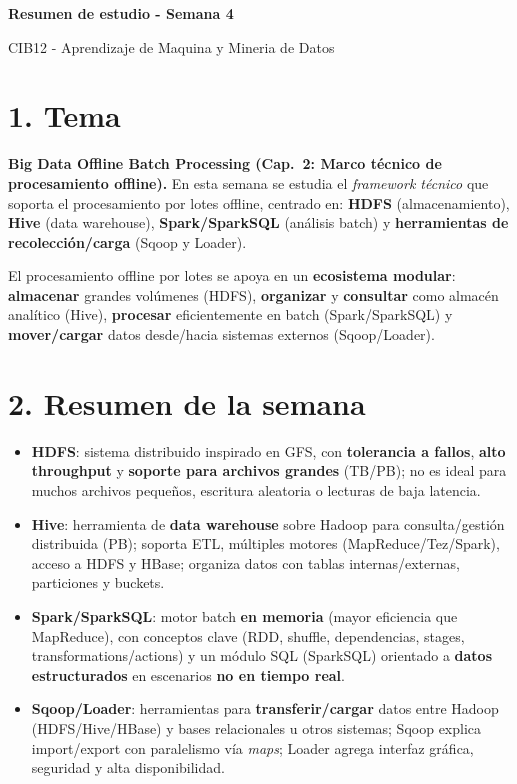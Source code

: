 \documentclass[8pt,a4paper,twocolumn]{article}
\newcommand{\resumentitulo}{Resumen de estudio - Semana 4}
\begin{document}
\vspace*{-1.0em}
\begin{tcolorbox}[colback=black!12,colframe=black!35,boxrule=0.3pt,arc=1pt,left=4pt,right=4pt,top=3pt,bottom=3pt]
{\bfseries\normalsize \resumentitulo\par}
{\scriptsize CIB12 - Aprendizaje de Maquina y Mineria de Datos\par}
\end{tcolorbox}
\vspace{0.15em}

\section{1. Tema}
\textbf{Big Data Offline Batch Processing (Cap.\ 2: Marco técnico de procesamiento offline).} En esta semana se estudia el \textit{framework técnico} que soporta el procesamiento por lotes offline, centrado en: \textbf{HDFS} (almacenamiento), \textbf{Hive} (data warehouse), \textbf{Spark/SparkSQL} (análisis batch) y \textbf{herramientas de recolección/carga} (Sqoop y Loader).

\begin{tcolorbox}[colback=black!7,colframe=black!35,boxrule=0.3pt,arc=1pt,left=4pt,right=4pt,top=3pt,bottom=3pt,title=\textbf{Idea central}]
El procesamiento offline por lotes se apoya en un \textbf{ecosistema modular}: \textbf{almacenar} grandes volúmenes (HDFS), \textbf{organizar} y \textbf{consultar} como almacén analítico (Hive), \textbf{procesar} eficientemente en batch (Spark/SparkSQL) y \textbf{mover/cargar} datos desde/hacia sistemas externos (Sqoop/Loader).
\end{tcolorbox}

\section{2. Resumen de la semana}
\begin{itemize}
\item \textbf{HDFS}: sistema distribuido inspirado en GFS, con \textbf{tolerancia a fallos}, \textbf{alto throughput} y \textbf{soporte para archivos grandes} (TB/PB); no es ideal para muchos archivos pequeños, escritura aleatoria o lecturas de baja latencia.
\item \textbf{Hive}: herramienta de \textbf{data warehouse} sobre Hadoop para consulta/gestión distribuida (PB); soporta ETL, múltiples motores (MapReduce/Tez/Spark), acceso a HDFS y HBase; organiza datos con tablas internas/externas, particiones y buckets.
\item \textbf{Spark/SparkSQL}: motor batch \textbf{en memoria} (mayor eficiencia que MapReduce), con conceptos clave (RDD, shuffle, dependencias, stages, transformations/actions) y un módulo SQL (SparkSQL) orientado a \textbf{datos estructurados} en escenarios \textbf{no en tiempo real}.
\item \textbf{Sqoop/Loader}: herramientas para \textbf{transferir/cargar} datos entre Hadoop (HDFS/Hive/HBase) y bases relacionales u otros sistemas; Sqoop explica import/export con paralelismo vía \textit{maps}; Loader agrega interfaz gráfica, seguridad y alta disponibilidad.
\end{itemize}
\end{document}
